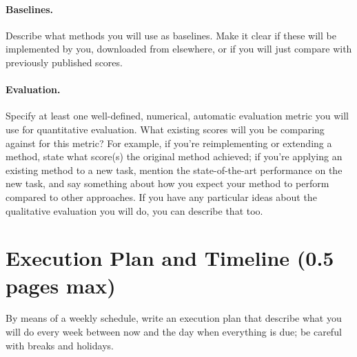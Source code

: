 \documentclass{article}
\begin{document}
\paragraph{Baselines.}
Describe what methods you will use as baselines. Make it clear if these will be implemented by you, downloaded from elsewhere, or if you will just compare with previously published scores.

\paragraph{Evaluation.}
Specify at least one well-defined, numerical, automatic evaluation metric you will use for quantitative evaluation. 
What existing scores will you be comparing against for this metric? For example, if you're reimplementing or extending a method, state what score(s) the original method achieved; if you're applying an existing method to a new task, mention the state-of-the-art performance on the new task, and say something about how you expect your method to perform compared to other approaches.
If you have any particular ideas about the qualitative evaluation you will do, you can describe that too.

\section{Execution Plan and Timeline (0.5 pages max)}

By means of a weekly schedule, write an execution plan that describe what you will do every week between now and the day when everything is due; be careful with breaks and holidays.



\end{document}

